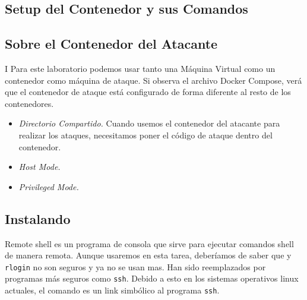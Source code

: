 \subsection{Setup del Contenedor y sus Comandos}





\subsection{Sobre el Contenedor del Atacante}

I
Para este laboratorio podemos usar tanto una Máquina Virtual como un contenedor como máquina de ataque. Si observa el archivo Docker Compose, verá que el contenedor de ataque está configurado de forma
diferente al resto de los contenedores.

\begin{itemize}
\item \textit{Directorio Compartido.} Cuando usemos el contenedor del atacante para realizar los ataques, necesitamos poner el código de ataque dentro del contenedor.


\item \textit{Host Mode.}



\item \textit{Privileged Mode.}


\end{itemize}


\subsection{Instalando \rsh}

Remote shell \rsh es un programa de consola que sirve para ejecutar comandos shell de manera remota. Aunque usaremos \rsh en esta tarea, deberíamos de saber que \rsh y \texttt{rlogin} no son seguros y ya no se usan mas.
Han sido reemplazados por programas más seguros como \texttt{ssh}.
Debido a esto en los sistemas operativos linux actuales, el comando \rsh es un link simbólico al programa \texttt{ssh}.

